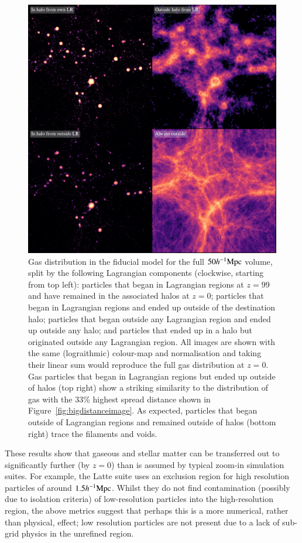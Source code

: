 \begin{figure}
    \centering
    \vspace{1cm}
    \includegraphics{figures/s50j7kAHF/four_images_magma_AHF.pdf}
    \caption{Gas distribution in the fiducial \simba{} model for the full $50h^{-1}{\rm Mpc}{}$ volume,
    split by the following Lagrangian components (clockwise, starting from top left): 
    particles that began in Lagrangian
    regions at $z=99$ and have remained in the associated halos at $z=0$; particles that began in Lagrangian regions and ended up outside of the destination halo;
    particles that began outside any Lagrangian region and ended up outside any halo; and particles that ended up in a halo but originated outside any Lagrangian region.
    All images are shown with the same
    (lograithmic) colour-map and normalisation and taking their linear sum
    would reproduce the full gas distribution at $z=0$.
    Gas particles that began in
    Lagrangian regions but ended up outside of halos (top right) show a striking
    similarity to the distribution of gas with the 33\% highest spread distance shown in
    Figure~\ref{fig:bigdistanceimage}. As expected, particles that began outside of Lagrangian regions and remained outside of halos (bottom right) trace the filaments and voids.}
    \vspace{1cm}
    \label{fig:lrtransfer}
\end{figure}

These results show that gaseous and stellar matter can be transferred out to
significantly further (by $z=0$) than is assumed by typical zoom-in
simulation suites. For example, the Latte \citep{Wetzel2016} suite uses an
exclusion region for high resolution particles of around $1.5 h^{-1}{\rm Mpc}{}$.
Whilst they do not find contamination (possibly due to isolation criteria) of
low-resolution particles into the high-resolution region, the above metrics
suggest that perhaps this is a more numerical, rather than physical, effect;
low resolution particles are not present due to a lack of sub-grid physics in
the unrefined region.
